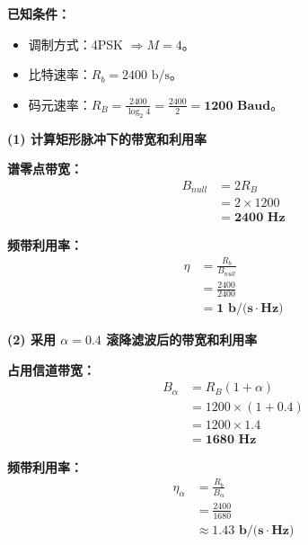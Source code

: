 \documentclass[a4paper,11pt]{ctexart}
\begin{document}
    \textbf{已知条件：}
    \begin{itemize}
        \item 调制方式：4PSK $\Rightarrow M=4$。
        \item 比特速率：$R_b = 2400 \text{ b/s}$。
        \item 码元速率：$R_B = \frac{2400}{\log_2 4} = \frac{2400}{2} = \mathbf{1200 \text{ Baud}}$。
    \end{itemize}
    
    \vspace{0.5cm}
    
    \textbf{(1) 计算矩形脉冲下的带宽和利用率}
    
    \textbf{谱零点带宽：}
    \begin{align*}
        B_{null} &= 2 R_B \\
                 &= 2 \times 1200 \\
                 &= \mathbf{2400 \text{ Hz}}
    \end{align*}
    
    \textbf{频带利用率：}
    \begin{align*}
        \eta &= \frac{R_b}{B_{null}} \\
             &= \frac{2400}{2400} \\
             &= \mathbf{1 \text{ b/(s}\cdot\text{Hz)}}
    \end{align*}
    
    \vspace{0.5cm}
    
    \textbf{(2) 采用 $\alpha = 0.4$ 滚降滤波后的带宽和利用率}
    
    \textbf{占用信道带宽：}
    \begin{align*}
        B_{\alpha} &= R_B (1 + \alpha) \\
                   &= 1200 \times (1 + 0.4) \\
                   &= 1200 \times 1.4 \\
                   &= \mathbf{1680 \text{ Hz}}
    \end{align*}
    
    \textbf{频带利用率：}
    \begin{align*}
        \eta_{\alpha} &= \frac{R_b}{B_{\alpha}} \\
                      &= \frac{2400}{1680} \\
                      &\approx \mathbf{1.43 \text{ b/(s}\cdot\text{Hz)}}
    \end{align*}
    
\end{document}
